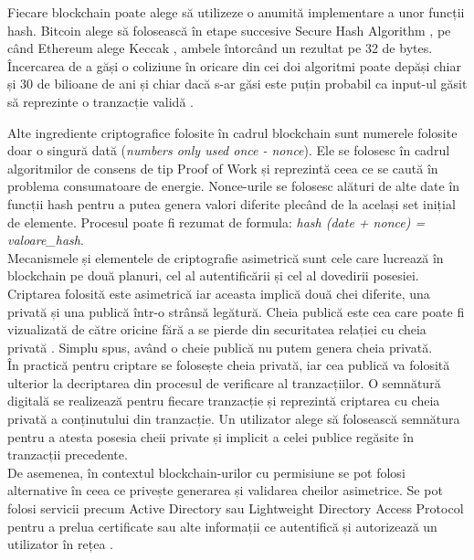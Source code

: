 Fiecare blockchain poate alege să utilizeze o anumită implementare a unor funcții hash. Bitcoin alege să folosească în etape succesive Secure Hash Algorithm \cite{Bitcoin_Protocol}, pe când Ethereum alege Keccak \cite{Ethereum_Protocol}, ambele întorcând un rezultat pe 32 de bytes. Încercarea de a găși o coliziune în oricare din cei doi algoritmi poate depăși chiar și 30 de bilioane de ani și chiar dacă s-ar găsi este puțin probabil ca input-ul găsit să reprezinte o tranzacție validă \cite{Blockchain_Overview_NIST}.\\

\clearpage

Alte ingrediente criptografice folosite în cadrul blockchain sunt numerele folosite doar o singură dată (\textit{numbers only used once - nonce}). Ele se folosesc în cadrul algoritmilor de consens de tip Proof of Work și reprezintă ceea ce se caută în problema consumatoare de energie. Nonce-urile se folosesc alături de alte date în funcții hash pentru a putea genera valori diferite plecând de la același set inițial de elemente. Procesul poate fi rezumat de formula: \textit{hash (date + nonce) = valoare\_hash}.\\

Mecanismele și elementele de criptografie asimetrică sunt cele care lucrează în blockchain pe două planuri, cel al autentificării și cel al dovedirii posesiei. Criptarea folosită este asimetrică iar aceasta implică două chei diferite, una privată și una publică într-o strânsă legătură. Cheia publică este cea care poate fi vizualizată de către oricine fără a se pierde din securitatea relației cu cheia privată \cite{Blockchain_Overview_NIST}. Simplu spus, având o cheie publică nu putem genera cheia privată.\\

În practică pentru criptare se folosește cheia privată, iar cea publică va folosită ulterior la decriptarea din procesul de verificare al tranzacțiilor. O semnătură digitală se realizează pentru fiecare tranzacție și reprezintă criptarea cu cheia privată a conținutului din tranzacție. Un utilizator alege să folosească semnătura pentru a atesta posesia cheii private și implicit a celei publice regăsite în tranzacții precedente.\\

De asemenea, în contextul blockchain-urilor cu permisiune se pot folosi alternative în ceea ce privește generarea și validarea cheilor asimetrice. Se pot folosi servicii precum Active Directory sau Lightweight Directory Access Protocol pentru a prelua certificate sau alte informații ce autentifică și autorizează un utilizator în rețea \cite{Blockchain_Overview_NIST}.\\

